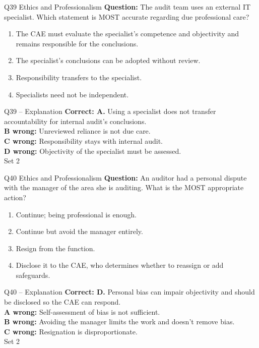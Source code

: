 \documentclass[aspectratio=169,10pt]{beamer}
\begin{document}
\begin{frame}[t]{Q39 \hfill {\scriptsize Ethics and Professionalism}}
	\small
	\textbf{Question:} The audit team uses an external IT specialist. Which statement is MOST accurate regarding due professional care?
	\begin{enumerate}[label=\Alph*.,itemsep=1pt,topsep=3pt]
			\item The CAE must evaluate the specialist's competence and objectivity and remains responsible for the conclusions.
			\item The specialist's conclusions can be adopted without review.
			\item Responsibility transfers to the specialist.
			\item Specialists need not be independent.
	\end{enumerate}
\end{frame}

\begin{frame}[t]{Q39 -- Explanation}
	\footnotesize
	\textbf{Correct: A.} Using a specialist does not transfer accountability for internal audit's conclusions. \\[5pt]
\textbf{B wrong:} Unreviewed reliance is not due care. \\[3pt]
\textbf{C wrong:} Responsibility stays with internal audit. \\[3pt]
\textbf{D wrong:} Objectivity of the specialist must be assessed. \\[3pt]
	\vfill {\tiny Set 2}
\end{frame}

\begin{frame}[t]{Q40 \hfill {\scriptsize Ethics and Professionalism}}
	\small
	\textbf{Question:} An auditor had a personal dispute with the manager of the area she is auditing. What is the MOST appropriate action?
	\begin{enumerate}[label=\Alph*.,itemsep=1pt,topsep=3pt]
			\item Continue; being professional is enough.
			\item Continue but avoid the manager entirely.
			\item Resign from the function.
			\item Disclose it to the CAE, who determines whether to reassign or add safeguards.
	\end{enumerate}
\end{frame}

\begin{frame}[t]{Q40 -- Explanation}
	\footnotesize
	\textbf{Correct: D.} Personal bias can impair objectivity and should be disclosed so the CAE can respond. \\[5pt]
\textbf{A wrong:} Self-assessment of bias is not sufficient. \\[3pt]
\textbf{B wrong:} Avoiding the manager limits the work and doesn't remove bias. \\[3pt]
\textbf{C wrong:} Resignation is disproportionate. \\[3pt]
	\vfill {\tiny Set 2}
\end{frame}
\end{document}
